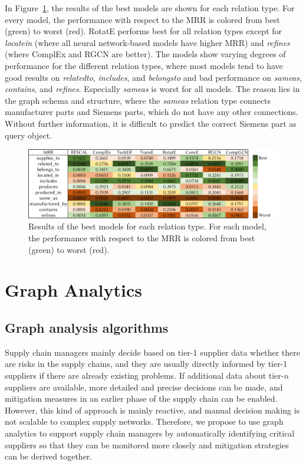 \documentclass[
]{ceurart}
\begin{document}
In Figure~\ref{fig:relations}, the results of the best models are shown for each relation type. For every model, the performance with respect to the MRR is colored from best (green) to worst (red). RotatE performs best for all relation types except for \textit{locate\textunderscore in} (where all neural network-based models have higher MRR) and \textit{refines} (where ComplEx and RGCN are better). The models show varying degrees of performance for the different relation types, where most models tend to have good results on \textit{related\textunderscore to}, \textit{includes}, and \textit{belongs\textunderscore to} and bad performance on \textit{same\textunderscore as}, \textit{contains}, and \textit{refines}. Especially \textit{same\textunderscore as} is worst for all models. The reason lies in the graph schema and structure, where the \textit{same\textunderscore as} relation type connects manufacturer parts and Siemens parts, which do not have any other connections. Without further information, it is difficult to predict the correct Siemens part as query object.  
\begin{figure}
  \centering
  \includegraphics[width=\linewidth]{figures/relation_results.png}
  \caption{Results of the best models for each relation type. For each model, the performance with respect to the MRR is colored from best (green) to worst (red).}
  \label{fig:relations}
\end{figure}

\section{Graph Analytics}
\label{sec:graph}
\subsection{Graph analysis algorithms}
Supply chain managers mainly decide based on tier-1 supplier data whether there are risks in the supply chains, and they are usually directly informed by tier-1 suppliers if there are already existing problems. If additional data about tier-$n$ suppliers are available, more detailed and precise decisions can be made, and mitigation measures in an earlier phase of the supply chain can be enabled. However, this kind of approach is mainly reactive, and manual decision making is not scalable to complex supply networks. Therefore, we propose to use graph analytics to support supply chain managers by automatically identifying critical suppliers so that they can be monitored more closely and mitigation strategies can be derived together. 
\end{document}
